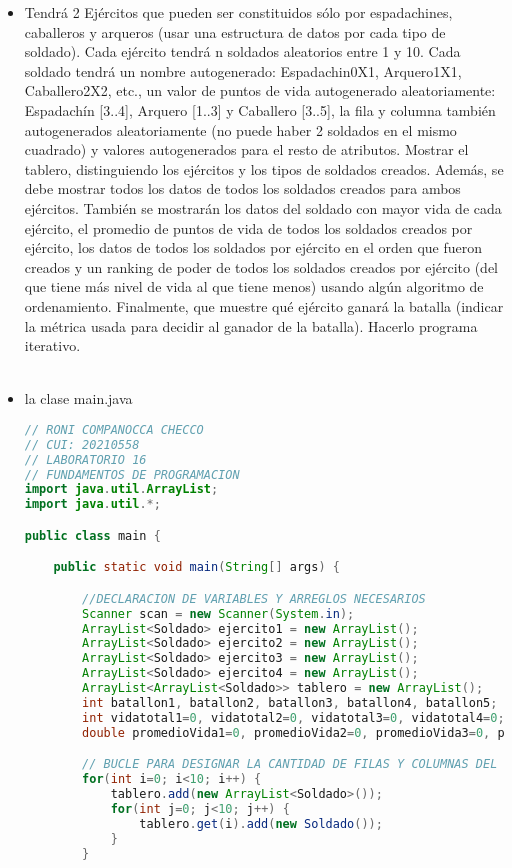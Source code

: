 \documentclass{article}
\begin{document}
\begin{itemize}
\begin{itemize}
        \item Tendrá 2 Ejércitos que pueden ser constituidos sólo por espadachines, caballeros y arqueros (usar una estructura de datos por cada tipo de soldado). Cada ejército tendrá n soldados aleatorios entre 1 y 10. Cada soldado tendrá un nombre autogenerado: Espadachin0X1, Arquero1X1, Caballero2X2, etc., un valor de puntos de vida autogenerado aleatoriamente: Espadachín [3..4], Arquero [1..3] y Caballero [3..5], la fila y columna también autogenerados aleatoriamente (no puede haber 2 soldados en el mismo cuadrado) y valores autogenerados para el resto de atributos. Mostrar el tablero, distinguiendo los ejércitos y los tipos de soldados creados. Además, se debe mostrar todos los datos de todos los soldados creados para ambos ejércitos. También se mostrarán los datos del soldado con mayor vida de cada ejército, el promedio de puntos de vida de todos los soldados creados por ejército, los datos de todos los soldados por ejército en el orden que fueron creados y un ranking de poder de todos los soldados creados por ejército (del que tiene más nivel de vida al que tiene menos) usando algún algoritmo de ordenamiento. Finalmente, que muestre qué ejército ganará la batalla (indicar la métrica usada para decidir al ganador de la batalla). Hacerlo programa iterativo.
        \\
        \\
      
        \item la clase main.java
        
        \begin{lstlisting}[language=java]
// RONI COMPANOCCA CHECCO
// CUI: 20210558
// LABORATORIO 16
// FUNDAMENTOS DE PROGRAMACION 
import java.util.ArrayList;
import java.util.*;

public class main {

	public static void main(String[] args) {

		//DECLARACION DE VARIABLES Y ARREGLOS NECESARIOS
		Scanner scan = new Scanner(System.in);
		ArrayList<Soldado> ejercito1 = new ArrayList();
		ArrayList<Soldado> ejercito2 = new ArrayList();
		ArrayList<Soldado> ejercito3 = new ArrayList();
		ArrayList<Soldado> ejercito4 = new ArrayList();
		ArrayList<ArrayList<Soldado>> tablero = new ArrayList();
		int batallon1, batallon2, batallon3, batallon4, batallon5;
		int vidatotal1=0, vidatotal2=0, vidatotal3=0, vidatotal4=0;
		double promedioVida1=0, promedioVida2=0, promedioVida3=0, promedioVida4=0;

		// BUCLE PARA DESIGNAR LA CANTIDAD DE FILAS Y COLUMNAS DEL TABLERO
		for(int i=0; i<10; i++) {
			tablero.add(new ArrayList<Soldado>());
			for(int j=0; j<10; j++) {
				tablero.get(i).add(new Soldado());
			}
		}


\end{lstlisting}
\end{itemize}
\end{itemize}
\end{document}
